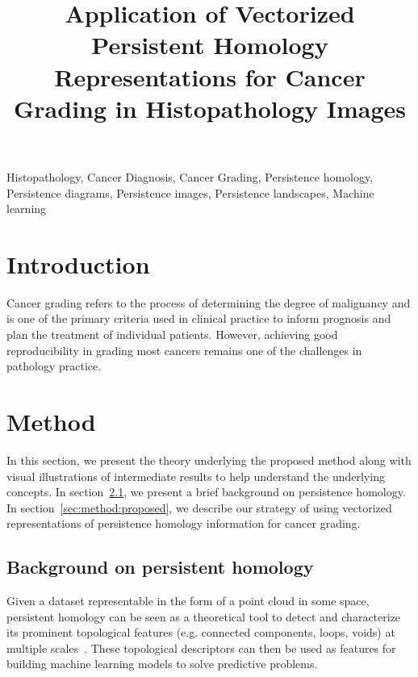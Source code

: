 \documentclass{article}
\title{Application of Vectorized Persistent Homology Representations for 
Cancer Grading in Histopathology Images}
\begin{document}
%
\maketitle
%
\begin{abstract}

\end{abstract}
%
\begin{keywords}
Histopathology, Cancer Diagnosis, Cancer Grading, Persistence homology, Persistence diagrams, Persistence images, Persistence landscapes, Machine learning
\end{keywords}
%
\section{Introduction}
\label{sec:intro}
Cancer grading refers to the process of determining the degree of malignancy and is one of the primary criteria used in clinical practice to inform prognosis and plan the treatment of individual patients. However, achieving good reproducibility in grading most cancers remains one of the challenges in pathology practice.

\section{Method}
\label{sec:method}
In this section, we present the theory underlying the proposed method along with visual illustrations of intermediate results to help understand the underlying concepts. In section~\ref{sec:method:homology}, we present a brief background on persistence homology. In section~\ref{sec:method:proposed}, we describe our strategy of using vectorized representations of persistence homology information for cancer grading.

\subsection{Background on persistent homology}
\label{sec:method:homology}
Given a dataset representable in the form of a point cloud in some space, persistent homology can be seen as a theoretical tool to detect and characterize its prominent topological features (e.g. connected components, loops, voids) at multiple scales~\cite{Zhu2013}. These topological descriptors can then be used as features for building machine learning models to solve predictive problems. 
\end{document}
